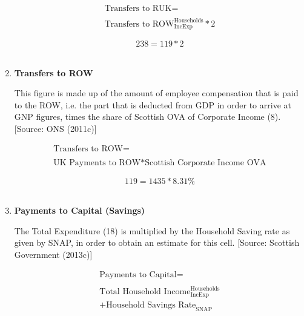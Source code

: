 \begin{enumerate}
\begin{equation}
\begin{split}
\text{Transfers to RUK} =  \\ \\
\text{Transfers to ROW}^\text{Households}_\text{IncExp}*2
\end{split} \label{eq:2.5.18}
\end{equation}

\begin{equation} \nonumber
238 = 119*2
\end{equation}\\


\item \textbf {Transfers to ROW}

This figure is made up of the amount of employee compensation that is paid to the ROW, i.e. the part that is deducted from GDP in order to arrive at GNP figures, times the share of Scottish OVA of Corporate Income (8). [Source: ONS (2011c)]

\begin{equation}
\begin{split}
\text{Transfers to ROW} =  \\ \\
\text{UK Payments to ROW}*\text{Scottish Corporate Income OVA}
\end{split} \label{eq:2.5.19}
\end{equation}

\begin{equation} \nonumber
119 = 1435*8.31\%
\end{equation}\\


\item \textbf {Payments to Capital (Savings)}

The Total Expenditure (18) is multiplied by the Household Saving rate as given by SNAP, in order to obtain an estimate for this cell. [Source: Scottish Government (2013c)]

\begin{equation}
\begin{split}
\text{Payments to Capital} =  \\ \\
\text{Total Household Income}^\text{Households}_\text{IncExp}\\
+\text{Household Savings Rate}_\text{SNAP}
\end{split} \label{eq:2.5.20}
\end{equation}


\end{enumerate}
